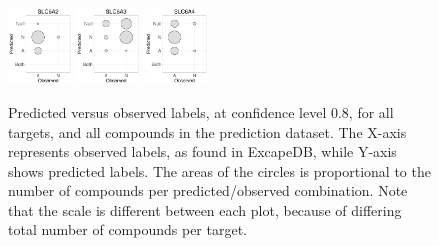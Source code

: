 \documentclass[utf8]{frontiers_suppmat} %
\begin{document}
\begin{figure}
\includegraphics[width=0.15\textwidth]{figures/validation_plots/slc6a2_0p8_valplot.pdf}
\includegraphics[width=0.15\textwidth]{figures/validation_plots/slc6a3_0p8_valplot.pdf}
\vspace*{10pt} %
\includegraphics[width=0.15\textwidth]{figures/validation_plots/slc6a4_0p8_valplot.pdf}

    \caption{Predicted versus observed labels, at confidence level 0.8, for all
    targets, and all compounds in the prediction dataset.  The X-axis
    represents observed labels, as found in ExcapeDB, while Y-axis shows
    predicted labels. The areas of the circles is proportional to the number of
    compounds per predicted/observed combination. Note that the scale is
    different between each plot, because of differing total number of compounds
    per target.}
    \label{fig:valplots_all_0.8}
\end{figure}
%
\end{document}
